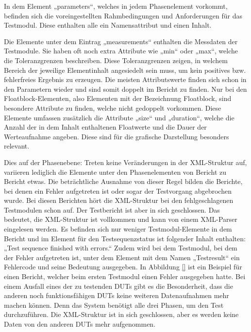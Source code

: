 In dem Element „parameters“, welches in jedem Phasenelement vorkommt, befinden sich die voreingestellten Rahmbedingungen
und Anforderungen für das Testmodul. Diese enthalten alle ein Namensattribut und einen Inhalt.

Die Elemente unter dem Eintrag „measurements“ enthalten die Messdaten der Testmodule. Sie haben oft noch extra Attribute
wie „min“ oder „max“, welche die Toleranzgrenzen beschreiben. Diese Toleranzgrenzen zeigen, in welchem Bereich der jeweilige
Elementinhalt angesiedelt sein muss, um kein positives bzw. fehlerfreies Ergebnis zu erzeugen.
Die meisten Attributswerte finden sich schon in den Parametern wieder und sind somit doppelt im Bericht zu finden.
Nur bei den Floatblock-Elementen, also Elementen mit der Bezeichnung Floatblock, sind besondere Attribute zu finden,
welche nicht gedoppelt vorkommen.
Diese Elemente umfassen zusätzlich die Attribute „size“ und „duration“, welche die Anzahl der in dem Inhalt enthaltenen
Floatwerte und die Dauer der Werteaufnahme angeben.
Diese sind für die grafische Darstellung besonders relevant.

Dies auf der Phasenebene: Treten keine Veränderungen in der XML-Struktur auf, variieren lediglich die Elemente unter den
Phasenelementen von Bericht zu Bericht etwas.
Die beträchtliche Ausnahme von dieser Regel bilden die Berichte, bei denen ein Fehler aufgetreten ist oder sogar der
Testvorgang abgebrochen wurde. Bei diesen Berichten hört die XML-Struktur bei den fehlgeschlagenen Testmodulen schon auf.
Der Testbericht ist aber in sich geschlossen. Das bedeutet, die XML-Struktur ist vollkommen und kann von einem XML-Parser eingelesen werden.
Es befinden sich nur weniger Testmodul-Elemente in dem Bericht und im Element für den Testsequenzstatus ist folgender Inhalt
enthalten: „Test sequence finished with errors.“ Zudem wird bei dem Testmodul, bei dem der Fehler aufgetreten ist, unter
dem Element mit dem Namen „Testresult“ ein Fehlercode und seine Bedeutung ausgegeben. In Abbildung \ref{} ist ein
Beispiel für einen Bericht, welcher beim ersten Testmodul einen Fehler ausgegeben hatte.
Bei einem Ausfall eines der zu testenden DUTs gibt es die Besonderheit, dass die anderen noch funktionsfähigen DUTs
keine weiteren Datenaufnahmen mehr machen können. Denn das System benötigt alle drei Phasen, um den Test durchzuführen.
Die XML-Struktur ist in sich geschlossen, aber es werden keine Daten von den anderen DUTs mehr aufgenommen.







